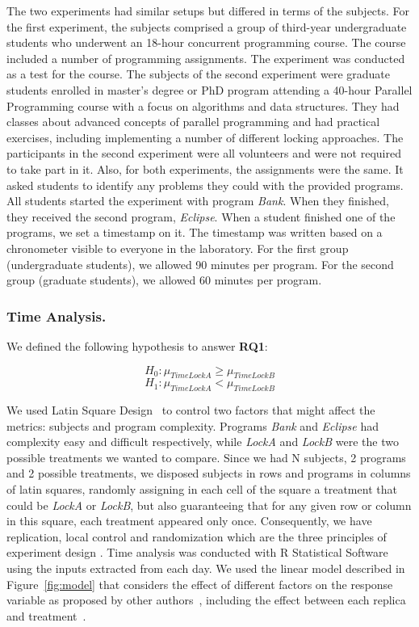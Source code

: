 The two experiments had similar setups but differed in terms of the subjects. For the first experiment, the subjects comprised a group of third-year undergraduate students who underwent an 18-hour concurrent programming course. The course included a number of programming assignments. The experiment was conducted as a test for the course. The subjects of the second experiment were  graduate students enrolled in master's degree or PhD program attending a 40-hour Parallel Programming course with a focus on algorithms and data structures. They had classes about advanced concepts of parallel programming and had practical exercises, including implementing a number of different locking approaches. The participants in the second experiment were all volunteers and were not required to take part in it. Also, for both experiments, the assignments were the same. It asked students to identify any problems they could with the provided programs. All students started the experiment with program \emph{Bank}. When they finished, they received the second program, \emph{Eclipse}. When a student finished one of the programs, we set a timestamp on it. The timestamp was written based on a chronometer visible to everyone in the laboratory. For the first group (undergraduate students), we allowed 90 minutes per program. For the second group (graduate students), we allowed 60 minutes per program. 

\subsubsection{Time Analysis.}

We defined the following hypothesis to answer {\bf RQ1}:

\begin{equation}
  H_{0} : \mu_{TimeLockA} \geq \mu_{TimeLockB}
\end{equation}
\begin{equation}
  H_{1} : \mu_{TimeLockA} < \mu_{TimeLockB}
\end{equation}

We used Latin Square Design~\cite{box} to control two factors that might affect the metrics: subjects and program complexity.
Programs \emph{Bank} and \emph{Eclipse} had complexity easy and difficult respectively, while \emph{LockA} and \emph{LockB} were the two possible treatments we wanted to compare.
Since we had N subjects, 2 programs and 2 possible treatments, we disposed subjects in rows and programs in columns of latin squares, randomly assigning in each cell of the square a treatment that could be \emph{LockA} or \emph{LockB}, but also guaranteeing that for any given row or column in this square, each treatment appeared only once. Consequently, we have replication, local control and randomization which are the three principles of experiment design \cite{box}. Time analysis was conducted with R Statistical Software using the inputs extracted from each day. We used the linear model described in Figure~\ref{fig:model} that considers the effect of different factors on the response variable as proposed by other authors~\cite{paola}, including the effect between each replica and treatment~\cite{sanchez}.

